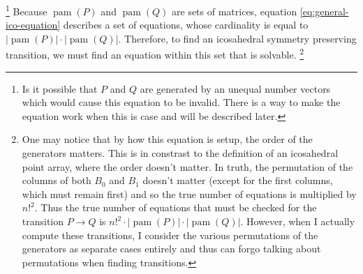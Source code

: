 \documentclass[a4paper,10pt]{article}
\let\oldfootnote\footnote
\renewcommand{\footnote}{\unskip\oldfootnote}
\theoremstyle{plain}
\theoremstyle{definition}
\theoremstyle{remark}
\newcommand\abs[1]{\left|#1\right|}
\DeclareMathOperator{\pam}{pam}
\begin{document}
\footnote{
	Is it possible that \( P \) and \( Q \) are generated by an unequal number vectors which would cause this equation to be invalid. 
	There is a way to make the equation work when this is case and will be described later.
	}
Because \( \pam(P) \) and \( \pam(Q) \) are sets of matrices, equation \ref{eq:general-ico-equation} describes a set of equations, whose cardinality is equal to \( \abs{\pam(P)}\cdot\abs{\pam(Q)}\).
Therefore, to find an icosahedral symmetry preserving transition, we must find an equation within this set that is solvable.
\footnote{
	One may notice that by how this equation is setup, the order of the generators matters.
	This is in constrast to the definition of an icosahedral point array, where the order doesn't matter.
	In truth, the permutation of the columns of both \( B_0 \) and \( B_1 \) doesn't matter (except for the first columns, which must remain first) and so the true number of equations is multiplied by \( n!^2 \).
	Thus the true number of equations that must be checked for the transition \( P \to Q \) is \( n!^2\cdot\abs{\pam(P)}\cdot\abs{\pam(Q)} \).
	However, when I actually compute these transitions, I consider the various permutations of the generators as separate cases entirely and thus can forgo talking about permutations when finding transitions.
	}
\end{document}

